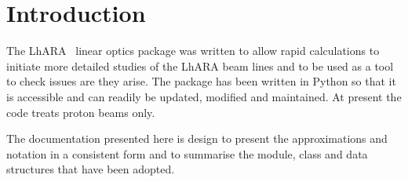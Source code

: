 \section{Introduction}

The LhARA~\cite{Aymar:2020drr,LhARA:pre-CDR} linear optics package was
written to allow rapid calculations to initiate more detailed studies
of the LhARA beam lines and to be used as a tool to check issues are
they arise. 
The package has been written in Python so that it is accessible and
can readily be updated, modified and maintained.
At present the code treats proton beams only.

The documentation presented here is design to present the
approximations and notation in a consistent form and to summarise the
module, class and data structures that have been adopted.
